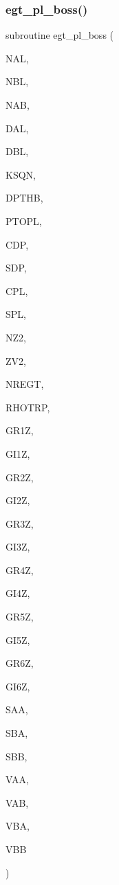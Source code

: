 \subsubsection{\texorpdfstring{egt\+\_\+pl\+\_\+boss()}{egt\_pl\_boss()}}
{\footnotesize\ttfamily subroutine egt\+\_\+pl\+\_\+boss (\begin{DoxyParamCaption}\item[{integer}]{N\+AL,  }\item[{integer}]{N\+BL,  }\item[{integer}]{N\+AB,  }\item[{real}]{D\+AL,  }\item[{real}]{D\+BL,  }\item[{complex}]{K\+S\+QN,  }\item[{real}]{D\+P\+T\+HB,  }\item[{real}]{P\+T\+O\+PL,  }\item[{real}]{C\+DP,  }\item[{real}]{S\+DP,  }\item[{real}]{C\+PL,  }\item[{real}]{S\+PL,  }\item[{integer}]{N\+Z2,  }\item[{real, dimension(nz2)}]{Z\+V2,  }\item[{integer}]{N\+R\+E\+GT,  }\item[{real, dimension(nregt)}]{R\+H\+O\+T\+RP,  }\item[{real, dimension(4,nregt,nz2)}]{G\+R1Z,  }\item[{real, dimension(4,nregt,nz2)}]{G\+I1Z,  }\item[{real, dimension(4,nregt,nz2)}]{G\+R2Z,  }\item[{real, dimension(4,nregt,nz2)}]{G\+I2Z,  }\item[{real, dimension(4,nregt,nz2)}]{G\+R3Z,  }\item[{real, dimension(4,nregt,nz2)}]{G\+I3Z,  }\item[{real, dimension(4,nregt,nz2)}]{G\+R4Z,  }\item[{real, dimension(4,nregt,nz2)}]{G\+I4Z,  }\item[{real, dimension(4,nregt,nz2)}]{G\+R5Z,  }\item[{real, dimension(4,nregt,nz2)}]{G\+I5Z,  }\item[{real, dimension(4,nregt,nz2)}]{G\+R6Z,  }\item[{real, dimension(4,nregt,nz2)}]{G\+I6Z,  }\item[{complex, dimension(nbl,nbl,nal,nal)}]{S\+AA,  }\item[{complex, dimension(nbl,nbl,nal,nal)}]{S\+BA,  }\item[{complex, dimension(nbl,nbl,nal,nal)}]{S\+BB,  }\item[{complex, dimension(nbl,nbl,nal,nal)}]{V\+AA,  }\item[{complex, dimension(nbl,nbl,nal,nal)}]{V\+AB,  }\item[{complex, dimension(nbl,nbl,nal,nal)}]{V\+BA,  }\item[{complex, dimension(nbl,nbl,nal,nal)}]{V\+BB }\end{DoxyParamCaption})}

